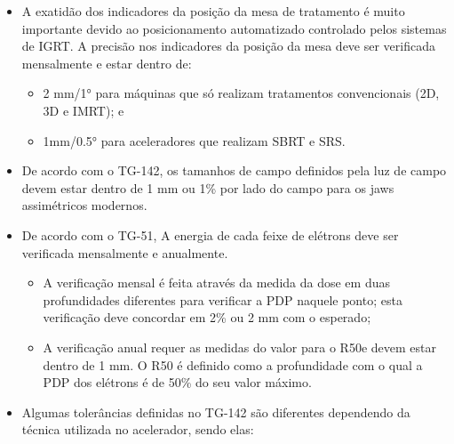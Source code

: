 \documentclass[11pt,a4paper]{article}
\newcounter{exemplo}
\begin{document}
\begin{exemplo}[Qualidade]
\begin{itemize}
        \item A exatidão dos indicadores da posição da mesa de tratamento é muito importante devido ao posicionamento automatizado controlado pelos sistemas de IGRT. A precisão nos indicadores da posição da mesa deve ser verificada mensalmente e estar dentro de:
            \begin{itemize}[label=\textcolor{CarnationPink}{$\blacktriangleright$}]
                \item 2 mm/\ang{1} para máquinas que só realizam tratamentos convencionais (2D, 3D e IMRT); e
                \item 1mm/\ang{0.5} para aceleradores que realizam SBRT e SRS.
            \end{itemize}

        \item De acordo com o TG-142, os tamanhos de campo definidos pela luz de campo devem estar dentro de 1 mm ou 1\% por lado do campo para os jaws assimétricos modernos.
        
        \item De acordo com o TG-51, A energia de cada feixe de elétrons deve ser verificada mensalmente e anualmente. 
            \begin{itemize}[label=\textcolor{CarnationPink}{$\blacktriangleright$}]
                \item A verificação mensal é feita através da medida da dose em duas profundidades diferentes para verificar a PDP naquele ponto; esta verificação deve concordar em 2\% ou 2 mm com o esperado;
                \item A verificação anual requer as medidas do valor para o R50e devem estar dentro de 1 mm. O R50 é definido como a profundidade com o qual a PDP dos elétrons é de 50\% do seu valor máximo.
            \end{itemize}

        \item Algumas tolerâncias definidas no TG-142 são diferentes dependendo da técnica utilizada no acelerador, sendo elas:
        

\end{itemize}
\end{exemplo}
\end{document}
